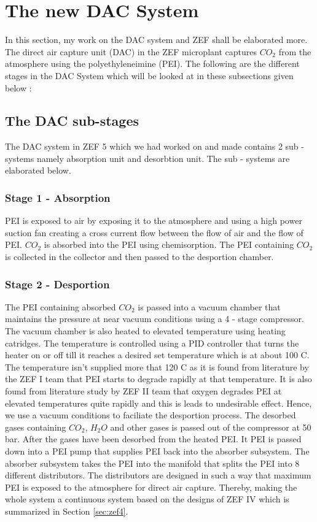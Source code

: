 \section{The new DAC System}
\label{sec:mywork}

In this section, my work on the DAC system and ZEF shall be elaborated more. The direct air capture unit (DAC) in the ZEF microplant captures $CO_2$ from the atmosphere using the polyethyleneimine (PEI). The following are the different stages in the DAC System which will be looked at in these subsections given below :

\subsection{The DAC sub-stages}

The DAC system in ZEF 5 which we had worked on and made contains 2 sub - systems namely absorption unit and desorbtion unit. The sub - systems are elaborated below. 

\subsubsection{Stage 1 - Absorption}
PEI is exposed to air by exposing it to the atmosphere and using a high power suction fan creating a cross current flow between the flow of air and the flow of PEI. $CO_2$ is absorbed into the PEI using chemisorption. The PEI containing $CO_2$ is collected in the collector and then passed to the desportion chamber. 

\subsubsection{Stage 2 - Desportion}

The PEI containing absorbed $CO_2$ is passed into a vacuum chamber that maintains the pressure at near vacuum conditions using a 4 - stage compressor. The vacuum chamber is also heated to elevated temperature using heating catridges. The temperature is controlled using a PID controller that turns the heater on or off till it reaches a desired set temperature which is at about 100 \degree C. The temperature isn't supplied more that 120 \degree C as it is found from literature by the ZEF I team that PEI starts to degrade rapidly at that temperature. 
\bigbreak \noindent
It is also found from literature study by ZEF II team that oxygen degrades PEI at elevated temperatures quite rapidly and this is leads to undesirable effect. Hence, we use a vacuum conditions to faciliate the desportion process. The desorbed gases containing $CO_2$, $H_2O$ and other gases is passed out of the compressor at 50 bar.
\bigbreak \noindent
After the gases have been desorbed from the heated PEI. It PEI is passed down into a PEI pump that supplies PEI back into the absorber subsystem. The absorber subsystem takes the PEI into the manifold that splits the PEI into 8 different distributors. The distributors are designed in such a way that maximum PEI is exposed to the atmosphere for direct air capture. Thereby, making the whole system a continuous system based on the designs of ZEF IV which is summarized in Section \ref{sec:zef4}.

